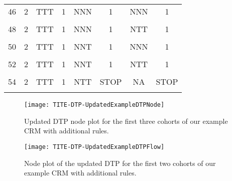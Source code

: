 \begin{table}[h!]
{\begin{tabular}[t]{cccccccc}
			46 & 2 & TTT & 1 & NNN & 1 & NNN & 1\\
			\cellcolor{gray!6}{47} & \cellcolor{gray!6}{2} & \cellcolor{gray!6}{TTT} & \cellcolor{gray!6}{1} & \cellcolor{gray!6}{NNN} & \cellcolor{gray!6}{1} & \cellcolor{gray!6}{NNT} & \cellcolor{gray!6}{1}\\
			48 & 2 & TTT & 1 & NNN & 1 & NTT & 1\\
			\cellcolor{gray!6}{49} & \cellcolor{gray!6}{2} & \cellcolor{gray!6}{TTT} & \cellcolor{gray!6}{1} & \cellcolor{gray!6}{NNN} & \cellcolor{gray!6}{1} & \cellcolor{gray!6}{TTT} & \cellcolor{gray!6}{1}\\
			50 & 2 & TTT & 1 & NNT & 1 & NNN & 1\\
			\cellcolor{gray!6}{51} & \cellcolor{gray!6}{2} & \cellcolor{gray!6}{TTT} & \cellcolor{gray!6}{1} & \cellcolor{gray!6}{NNT} & \cellcolor{gray!6}{1} & \cellcolor{gray!6}{NNT} & \cellcolor{gray!6}{1}\\
			52 & 2 & TTT & 1 & NNT & 1 & NTT & 1\\
			\cellcolor{gray!6}{53} & \cellcolor{gray!6}{2} & \cellcolor{gray!6}{TTT} & \cellcolor{gray!6}{1} & \cellcolor{gray!6}{NNT} & \cellcolor{gray!6}{1} & \cellcolor{gray!6}{TTT} & \cellcolor{gray!6}{STOP}\\
			54 & 2 & TTT & 1 & NTT & STOP & NA & STOP\\
			\cellcolor{gray!6}{55} & \cellcolor{gray!6}{2} & \cellcolor{gray!6}{TTT} & \cellcolor{gray!6}{1} & \cellcolor{gray!6}{TTT} & \cellcolor{gray!6}{STOP} & \cellcolor{gray!6}{NA} & \cellcolor{gray!6}{STOP}\\
			\bottomrule
	\end{tabular}}
\end{table}

\begin{figure}[h!]
	\centering
	\caption[Updated DTP node plot.]{Updated DTP node plot for the first three cohorts of our example CRM with additional rules.}
	\label{fig_tite-dtp:UpdatedDTPExampleNode}
	\texttt{[image: TITE-DTP-UpdatedExampleDTPNode]}
\end{figure}

\begin{figure}[h!]
	\centering
	\caption[Updated DTP flow plot.]{Node plot of the updated DTP for the first two cohorts of our example CRM with additional rules.}
	\label{fig_tite-dtp:UpdatedDTPExampleFlow}
	\texttt{[image: TITE-DTP-UpdatedExampleDTPFlow]}
\end{figure}

